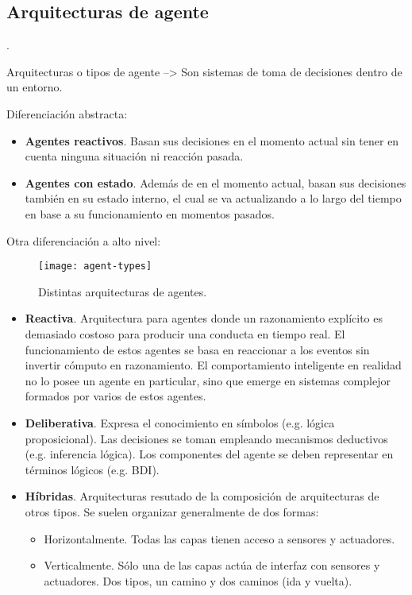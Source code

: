 \subsection{Arquitecturas de agente}

.

Arquitecturas o tipos de agente --> Son sistemas de toma de decisiones dentro de un entorno.

Diferenciación abstracta:

\begin{itemize}
	\item \textbf{Agentes reactivos}. Basan sus decisiones en el momento actual sin tener en cuenta ninguna situación ni reacción pasada.
	\item \textbf{Agentes con estado}. Además de en el momento actual, basan sus decisiones también en su estado interno, el cual se va actualizando a lo largo del tiempo en base a su funcionamiento en momentos pasados.
\end{itemize}

Otra diferenciación a alto nivel:


\begin{figure}
	\texttt{[image: agent-types]}
	\caption{Distintas arquitecturas de agentes. }
	\label{fig:agent-types}
\end{figure}


\begin{itemize}
	\item \textbf{Reactiva}. Arquitectura para agentes donde un razonamiento explícito es demasiado costoso para producir una conducta en tiempo real. El funcionamiento de estos agentes se basa en reaccionar a los eventos sin invertir cómputo en razonamiento. El comportamiento inteligente en realidad no lo posee un agente en particular, sino que emerge en sistemas complejor formados por varios de estos agentes.
	\item \textbf{Deliberativa}. Expresa el conocimiento en símbolos (e.g. lógica proposicional). Las decisiones se toman empleando mecanismos deductivos (e.g. inferencia lógica). Los componentes del agente se deben representar en términos lógicos (e.g. BDI).
	\item \textbf{Híbridas}. Arquitecturas resutado de la composición de arquitecturas de otros tipos. Se suelen organizar generalmente de dos formas:
	\begin{itemize}
		\item Horizontalmente. Todas las capas tienen acceso a sensores y actuadores.
		\item Verticalmente. Sólo una de las capas actúa de interfaz con sensores y actuadores. Dos tipos, un camino y dos caminos (ida y vuelta).
	\end{itemize}
\end{itemize}

